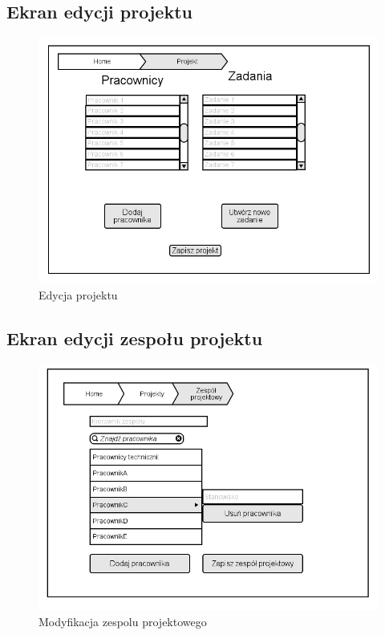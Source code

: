 \subsection{Ekran edycji projektu}
\begin{figure}[H]
    \centering
    \includegraphics[scale=0.7]{diagramy/intefejsy/Projekt.png}
    \caption{Edycja projektu}
    \label{fig:usecase}
\end{figure}

\subsection{Ekran edycji zespołu projektu}
\begin{figure}[H]
    \centering
    \includegraphics[scale=0.7]{diagramy/intefejsy/Modyfikacja_zespolu_projektowego.png}
    \caption{Modyfikacja zespolu projektowego}
    \label{fig:usecase}
\end{figure}


